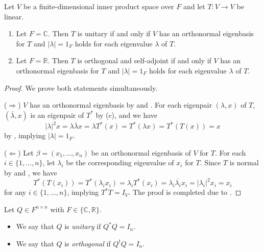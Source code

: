 \begin{theorem}
  Let $V$ be a finite-dimensional inner product space over $F$ and let
  $T: V \to V$ be linear.
  \begin{enumerate}
    \item Let $F = \mathbb{C}$.
    Then $T$ is unitary if and only if $V$ has an orthonormal eigenbasis for
    $T$ and $|\lambda| = 1_F$ holds for each eigenvalue $\lambda$ of $T$.
    \item Let $F = \mathbb{R}$.
    Then $T$ is orthogonal and self-adjoint if and only if $V$ has an
    orthonormal eigenbasis for $T$ and $|\lambda| = 1_F$ holds for each
    eigenvalue $\lambda$ of $T$.
  \end{enumerate}
\end{theorem}
\begin{proof}
  We prove both statements simultaneously.

  ($\Rightarrow$)
  $V$ has an orthonormal eigenbasis by
   and
  .
  For each eigenpair $(\lambda, x)$ of $T$, $(\overline\lambda, x)$ is an
  eigenpair of $T^*$ by  (c), and we have
  \begin{equation*}
    |\lambda|^2x
    = \lambda\overline\lambda x
    = \lambda T^*(x)
    = T^*(\lambda x)
    = T^*(T(x))
    = x
  \end{equation*}
  by , implying $|\lambda| = 1_F$.

  ($\Leftarrow$)
  Let $\beta = (x_1, \dots, x_n)$ be an orthonormal eigenbasis of $V$ for $T$.
  For each $i \in \{1, \dots, n\}$, let $\lambda_i$ be the corresponding
  eigenvalue of $x_i$ for $T$.
  Since $T$ is normal by
   and
  , we have
  \begin{equation*}
    T^*(T(x_i))
    = T^*(\lambda_i x_i)
    = \lambda_iT^*(x_i)
    = \lambda_i\overline{\lambda_i}x_i
    = |\lambda_i|^2x_i
    = x_i
  \end{equation*}
  for any $i \in \{1, \dots, n\}$, implying $T^*T = I_V$.
  The proof is completed due to .
\end{proof}

\begin{definition}
  Let $Q \in F^{n \times n}$ with $F \in \{\mathbb{C}, \mathbb{R}\}$.
  \begin{itemize}
    \item We say that $Q$ is \emph{unitary} if $Q^*Q = I_n$.
    \item We say that $Q$ is \emph{orthogonal} if $Q^tQ = I_n$.
  \end{itemize}
\end{definition}

